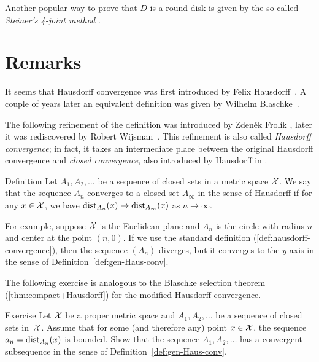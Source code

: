 Another popular way to prove that $D$ is a round disk is given by the so-called {}\emph{Steiner's 4-joint method} \cite{blaschke}.

\section{Remarks}\label{sec:H-variation}

It seems that Hausdorff convergence was first introduced by Felix Hausdorff~\cite{hausdorff}.
A couple of years later an equivalent definition was given by Wilhelm Blaschke~\cite{blaschke}.

The following refinement of the definition was introduced by  Zdeněk Frolík \cite{frolik},
later it was rediscovered by Robert Wijsman~\cite{wijsman}.  
This refinement is also called \emph{Hausdorff convergence};
in fact, it takes an intermediate place between the original Hausdorff convergence and {}\emph{closed convergence}, also introduced by Hausdorff in \cite{hausdorff}.

\begin{thm}{Definition}\label{def:gen-Haus-conv}
Let $A_1,A_2,\dots$ be a sequence of closed sets in a metric space $\mathcal{X}$.
We say that the sequence $A_n$ converges to a closed set $A_\infty$ in the sense of Hausdorff if for any $x\in\mathcal{X}$, we have
$\distfun_{A_n}(x)\z\to \distfun_{A_\infty}(x)$ as $n\to\infty$.
\end{thm}

For example, suppose $\mathcal{X}$ is the Euclidean plane and $A_n$ is the circle with radius $n$ and center at the point $(n,0)$.
If we use the standard definition (\ref{def:hausdorff-convergence}), then the sequence $(A_n)$ diverges, but it converges to the $y$-axis in the sense of Definition~\ref{def:gen-Haus-conv}.

The following exercise is analogous to the Blaschke selection theorem (\ref{thm:compact+Hausdorff}) for the modified Hausdorff convergence.

\begin{thm}{Exercise}\label{ex:generalized-selection}
Let $\mathcal{X}$ be a proper metric space
and $A_1,A_2,\dots$ be a sequence of closed sets in~$\mathcal{X}$.
Assume that for some (and therefore any) point  $x\in\mathcal{X}$, 
the sequence $a_n=\mathrm{dist}_{A_n}(x)$ is bounded.
Show that the sequence  $A_1,A_2,\dots$ has a convergent subsequence in the sense of Definition~\ref{def:gen-Haus-conv}.
\end{thm}

